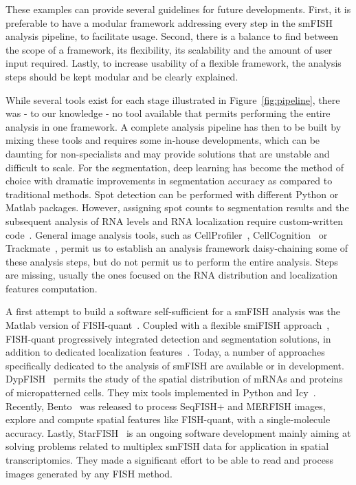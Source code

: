 These examples can provide several guidelines for future developments.
First, it is preferable to have a modular framework addressing every step in the \ac{smFISH} analysis pipeline, to facilitate usage.
Second, there is a balance to find between the scope of a framework, its flexibility, its scalability and the amount of user input required.
Lastly, to increase usability of a flexible framework, the analysis steps should be kept modular and be clearly explained.

While several tools exist for each stage illustrated in Figure~\ref{fig:pipeline}, there was - to our knowledge - no tool available that permits performing the entire analysis in one framework.
A complete analysis pipeline has then to be built by mixing these tools and requires some in-house developments, which can be daunting for non-specialists and may provide solutions that are unstable and difficult to scale.
For the segmentation, deep learning has become the method of choice with dramatic improvements in segmentation accuracy as compared to traditional methods.
Spot detection can be performed with different Python or Matlab packages.
However, assigning spot counts to segmentation results and the subsequent analysis of \ac{RNA} levels and RNA localization require custom-written code~\cite{stoeger_computer_2015, samacoits_computational_2018}.
General image analysis tools, such as CellProfiler~\cite{mcquin_cellprofiler_2018}, CellCognition~\cite{held_cellcognition_2010} or Trackmate~\cite{ershov_trackmate_2022}, permit us to establish an analysis framework daisy-chaining some of these analysis steps, but do not permit us to perform the entire analysis.
Steps are missing, usually the ones focused on the \ac{RNA} distribution and localization features computation.

A first attempt to build a software self-sufficient for a \ac{smFISH} analysis was the Matlab version of FISH-quant~\cite{mueller_fish-quant_2013}.
Coupled with a flexible \ac{smiFISH} approach~\cite{tsanov_smifish_2016}, FISH-quant progressively integrated detection and segmentation solutions, in addition to dedicated localization features~\cite{samacoits_computational_2018}.
Today, a number of approaches specifically dedicated to the analysis of \ac{smFISH} are available or in development.
DypFISH~\cite{savulescu_dypfish_2019,savulescu_interrogating_2021} permits the study of the spatial distribution of \ac{mRNA}s and proteins of micropatterned cells.
They mix tools implemented in Python and Icy~\cite{de_chaumont_icy_2012}.
Recently, Bento~\cite{mah_bento_2022} was released to process \ac{SeqFISH}+ and \ac{MERFISH} images, explore and compute spatial features like FISH-quant, with a single-molecule accuracy.
Lastly, StarFISH~\cite{perkel_starfish_2019} is an ongoing software development mainly aiming at solving problems related to multiplex \ac{smFISH} data for application in spatial transcriptomics.
They made a significant effort to be able to read and process images generated by any \ac{FISH} method.

